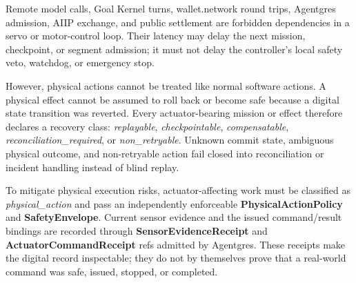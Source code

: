 \documentclass[
  11pt,
]{article}
\begin{document}
Remote model calls, Goal Kernel turns, wallet.network round trips, Agentgres
admission, AIIP exchange, and public settlement are forbidden dependencies in
a servo or motor-control loop. Their latency may delay the next mission,
checkpoint, or segment admission; it must not delay the controller's local
safety veto, watchdog, or emergency stop.

However, physical actions cannot be treated like normal software
actions. A physical effect cannot be assumed to roll back or become safe
because a digital state transition was reverted. Every actuator-bearing
mission or effect therefore declares a recovery class:
\emph{replayable}, \emph{checkpointable}, \emph{compensatable},
\emph{reconciliation\_required}, or \emph{non\_retryable}. Unknown commit
state, ambiguous physical outcome, and non-retryable action fail closed into
reconciliation or incident handling instead of blind replay.

To mitigate physical execution risks, actuator-affecting work must be
classified as \emph{physical\_action} and pass an independently enforceable
\textbf{PhysicalActionPolicy} and \textbf{SafetyEnvelope}. Current sensor
evidence and the issued command/result bindings are recorded through
\textbf{SensorEvidenceReceipt} and \textbf{ActuatorCommandReceipt} refs
admitted by Agentgres. These receipts make the digital record inspectable;
they do not by themselves prove that a real-world command was safe, issued,
stopped, or completed.


\begin{center}
\end{center}
\end{document}
